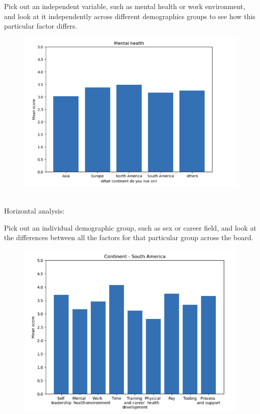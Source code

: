\documentclass[12pt]{article}
\begin{document}
Pick out an independent variable, such as mental health or work environment,  and look at it independently across different demographics groups to see how this particular factor differs.
\begin{figure}[h]
    \centering
    \includegraphics[scale=1]{vertical.png}
    \label{vertical}
\end{figure} \\
Horizontal analysis:

Pick out an individual demographic group, such as sex or career field, and look at the differences between all the factors for that particular group across the board.
\begin{figure}[h]
    \centering
    \includegraphics[scale=1]{horizontal.png}
    \label{horizontal}
\end{figure} \\
\end{document}
